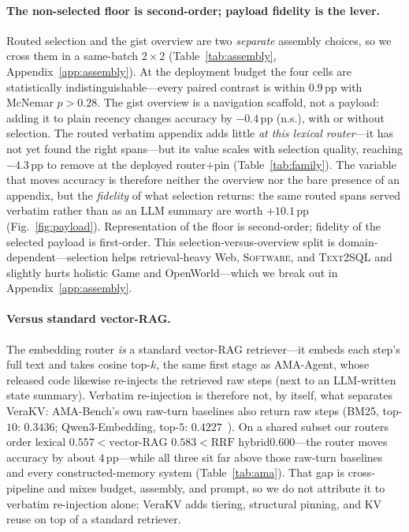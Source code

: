 \documentclass{article} %
\newcommand{\pp}{\,\mathrm{pp}}
\newcommand{\kvm}{VeraKV}
\begin{document}
\paragraph{The non-selected floor is second-order; payload fidelity is the lever.}
Routed selection and the gist overview are two \emph{separate} assembly choices, so we
cross them in a same-batch $2\times2$ (Table~\ref{tab:assembly}, Appendix~\ref{app:assembly}).
At the deployment
budget the four cells are statistically indistinguishable---every paired contrast is
within $0.9\pp$ with McNemar $p>0.28$. The gist overview is a navigation scaffold, not a payload: adding it to plain
recency changes accuracy by $-0.4\pp$ (n.s.), with or without selection. The routed
verbatim appendix adds little \emph{at this lexical router}---it has not yet found the
right spans---but its value scales with selection quality, reaching $-4.3\pp$ to remove
at the deployed router$+$pin (Table~\ref{tab:family}). The variable that moves
accuracy is therefore neither the overview nor the bare presence of an appendix, but the
\emph{fidelity} of what selection returns: the same routed spans served verbatim rather
than as an LLM summary are worth $+10.1\pp$ (Fig.~\ref{fig:payload}). Representation of
the floor is second-order; fidelity of the selected payload is first-order. This
selection-versus-overview split is domain-dependent---selection helps retrieval-heavy
Web, \textsc{Software}, and \textsc{Text2SQL} and slightly hurts holistic Game and
OpenWorld---which we break out in Appendix~\ref{app:assembly}.

\paragraph{Versus standard vector-RAG.}
The embedding router \emph{is} a standard vector-RAG retriever---it embeds each
step's full text and takes cosine top-$k$, the same first stage as AMA-Agent, whose released code
likewise re-injects the retrieved raw steps (next to an LLM-written state summary). Verbatim re-injection is
therefore not, by itself, what separates \kvm{}: AMA-Bench's own raw-turn baselines also return raw steps (BM25, top-$10$: $0.3436$; Qwen3-Embedding, top-$5$: $0.4227$~\citep{amabench}). On a shared subset our routers order
$\text{lexical }0.557 < \text{vector-RAG }0.583 < \text{RRF hybrid
}0.600$---the router moves accuracy by about $4\pp$---while all three sit far above
those raw-turn baselines and every constructed-memory system (Table~\ref{tab:ama}). That gap is cross-pipeline and mixes budget,
assembly, and prompt, so we do not attribute it to verbatim re-injection alone;
\kvm{} adds tiering, structural pinning, and KV reuse on top of a standard retriever.
\end{document}
